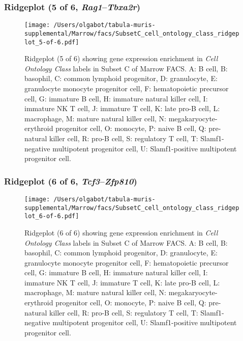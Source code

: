 \subsubsection{Ridgeplot (5 of 6, \emph{Rag1}--\emph{Tbxa2r})}
\begin{figure}[h]
\centering
\texttt{[image: /Users/olgabot/tabula-muris-supplemental/Marrow/facs/SubsetC\_cell\_ontology\_class\_ridgeplot\_5-of-6.pdf]}

\caption{ Ridgeplot (5 of 6)  showing gene expression enrichment in \emph{Cell Ontology Class} labels in Subset C of Marrow FACS. A: B cell, B: basophil, C: common lymphoid progenitor, D: granulocyte, E: granulocyte monocyte progenitor cell, F: hematopoietic precursor cell, G: immature B cell, H: immature natural killer cell, I: immature NK T cell, J: immature T cell, K: late pro-B cell, L: macrophage, M: mature natural killer cell, N: megakaryocyte-erythroid progenitor cell, O: monocyte, P: naive B cell, Q: pre-natural killer cell, R: pro-B cell, S: regulatory T cell, T: Slamf1-negative multipotent progenitor cell, U: Slamf1-positive multipotent progenitor cell.}
\end{figure}


\clearpage

\subsubsection{Ridgeplot (6 of 6, \emph{Tcf3}--\emph{Zfp810})}
\begin{figure}[h]
\centering
\texttt{[image: /Users/olgabot/tabula-muris-supplemental/Marrow/facs/SubsetC\_cell\_ontology\_class\_ridgeplot\_6-of-6.pdf]}

\caption{ Ridgeplot (6 of 6)  showing gene expression enrichment in \emph{Cell Ontology Class} labels in Subset C of Marrow FACS. A: B cell, B: basophil, C: common lymphoid progenitor, D: granulocyte, E: granulocyte monocyte progenitor cell, F: hematopoietic precursor cell, G: immature B cell, H: immature natural killer cell, I: immature NK T cell, J: immature T cell, K: late pro-B cell, L: macrophage, M: mature natural killer cell, N: megakaryocyte-erythroid progenitor cell, O: monocyte, P: naive B cell, Q: pre-natural killer cell, R: pro-B cell, S: regulatory T cell, T: Slamf1-negative multipotent progenitor cell, U: Slamf1-positive multipotent progenitor cell.}
\end{figure}


\clearpage

